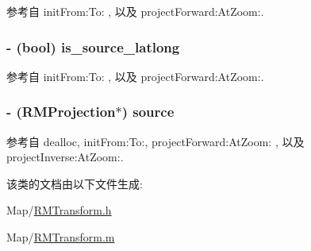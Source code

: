 参考自 init\-From\-:\-To\-: , 以及 project\-Forward\-:\-At\-Zoom\-:.

\hypertarget{interface_r_m_transform_aedd620e0e19c3b4a7d626ab5b45539a7}{
\subsubsection[{is\-\_\-source\-\_\-latlong}]{\setlength{\rightskip}{0pt plus 5cm}-\/ (bool) is\-\_\-source\-\_\-latlong\hspace{0.3cm}{\ttfamily [protected]}}}\label{interface_r_m_transform_aedd620e0e19c3b4a7d626ab5b45539a7}


参考自 init\-From\-:\-To\-: , 以及 project\-Forward\-:\-At\-Zoom\-:.

\hypertarget{interface_r_m_transform_a9064c8c9ce663542284bbc1012590f80}{
\subsubsection[{source}]{\setlength{\rightskip}{0pt plus 5cm}-\/ ({\bf R\-M\-Projection}$\ast$) source\hspace{0.3cm}{\ttfamily [protected]}}}\label{interface_r_m_transform_a9064c8c9ce663542284bbc1012590f80}


参考自 dealloc, init\-From\-:\-To\-:, project\-Forward\-:\-At\-Zoom\-: , 以及 project\-Inverse\-:\-At\-Zoom\-:.



该类的文档由以下文件生成\-:\begin{DoxyCompactItemize}
\item 
Map/\hyperlink{_r_m_transform_8h}{R\-M\-Transform.\-h}\item 
Map/\hyperlink{_r_m_transform_8m}{R\-M\-Transform.\-m}\end{DoxyCompactItemize}
